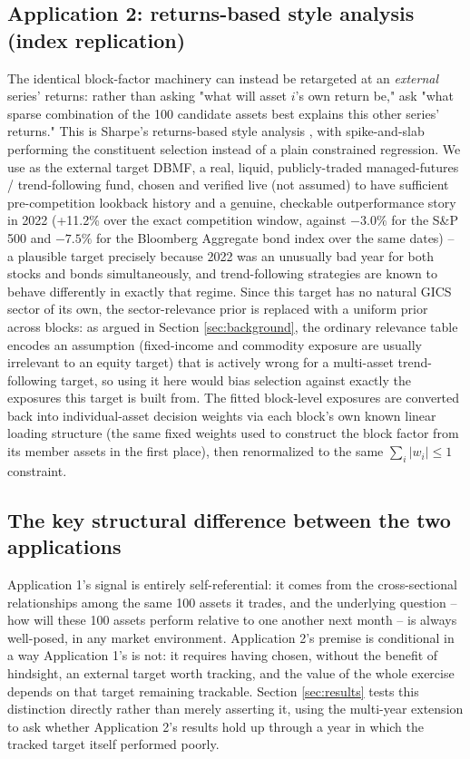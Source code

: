 \documentclass[11pt]{article}
\begin{document}
\subsection{Application 2: returns-based style analysis (index replication)}
The identical block-factor machinery can instead be retargeted at an
\emph{external} series' returns: rather than asking "what will asset $i$'s own
return be," ask "what sparse combination of the 100 candidate assets best
explains this other series' returns." This is Sharpe's returns-based style
analysis \citep{sharpe1992}, with spike-and-slab performing the constituent
selection instead of a plain constrained regression. We use as the external
target DBMF, a real, liquid, publicly-traded managed-futures / trend-following
fund, chosen and verified live (not assumed) to have sufficient
pre-competition lookback history and a genuine, checkable
outperformance story in 2022 (+11.2\% over the exact competition window,
against $-3.0\%$ for the S\&P 500 and $-7.5\%$ for the Bloomberg Aggregate
bond index over the same dates) -- a plausible target precisely because 2022
was an unusually bad year for both stocks and bonds simultaneously, and
trend-following strategies are known to behave differently in exactly that
regime. Since this target has no natural GICS sector of its own, the
sector-relevance prior is replaced with a uniform prior across blocks: as
argued in Section \ref{sec:background}, the ordinary relevance table encodes
an assumption (fixed-income and commodity exposure are usually irrelevant to
an equity target) that is actively wrong for a multi-asset trend-following
target, so using it here would bias selection against exactly the exposures
this target is built from. The fitted block-level exposures are converted
back into individual-asset decision weights via each block's own known linear
loading structure (the same fixed weights used to construct the block factor
from its member assets in the first place), then renormalized to the same
$\sum_i|w_i|\le 1$ constraint.

\subsection{The key structural difference between the two applications}
Application 1's signal is entirely self-referential: it comes from the
cross-sectional relationships among the same 100 assets it trades, and the
underlying question -- how will these 100 assets perform relative to one
another next month -- is always well-posed, in any market environment.
Application 2's premise is conditional in a way Application 1's is not: it
requires having chosen, without the benefit of hindsight, an external target
worth tracking, and the value of the whole exercise depends on that target
remaining trackable. Section \ref{sec:results} tests this distinction
directly rather than merely asserting it, using the multi-year extension to
ask whether Application 2's results hold up through a year in which the
tracked target itself performed poorly.
\end{document}
